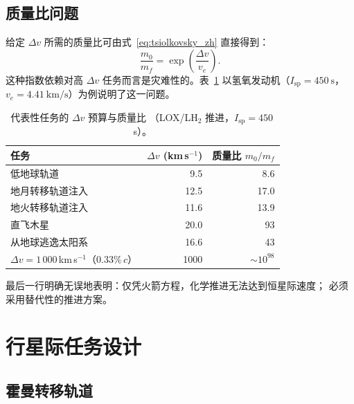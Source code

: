 \documentclass[12pt,a4paper]{article}
\begin{document}
\subsection{质量比问题}

给定 $\Delta v$ 所需的质量比可由式~\eqref{eq:tsiolkovsky_zh} 直接得到：
\begin{equation}
  \frac{m_0}{m_f} = \exp\!\left(\frac{\Delta v}{v_e}\right).
\end{equation}
这种指数依赖对高 $\Delta v$ 任务而言是灾难性的。表~\ref{tab:dv_zh}
以氢氧发动机（$I_{\mathrm{sp}} = \SI{450}{\second}$，
$v_e = \SI{4.41}{\kilo\meter\per\second}$）为例说明了这一问题。

\begin{table}[h]
  \centering
  \caption{代表性任务的 $\Delta v$ 预算与质量比
           （LOX/LH$_2$ 推进，$I_{\mathrm{sp}} = 450$\,s）。}
  \label{tab:dv_zh}
  \begin{tabularx}{\textwidth}{Xrr}
    \toprule
    任务 & $\Delta v$ (km\,s$^{-1}$) & 质量比 $m_0/m_f$ \\
    \midrule
    低地球轨道 & 9.5  & 8.6   \\
    地月转移轨道注入 & 12.5 & 17.0 \\
    地火转移轨道注入 & 11.6 & 13.9 \\
    直飞木星 & 20.0 & 93    \\
    从地球逃逸太阳系 & 16.6 & 43    \\
    $\Delta v = 1\,000$\,km\,s$^{-1}$（$0.33\%\,c$） &
    \num{1000} & $\sim 10^{98}$ \\
    \bottomrule
  \end{tabularx}
\end{table}

最后一行明确无误地表明：仅凭火箭方程，化学推进无法达到恒星际速度；
必须采用替代性的推进方案。

\section{行星际任务设计}

\subsection{霍曼转移轨道}
\end{document}
